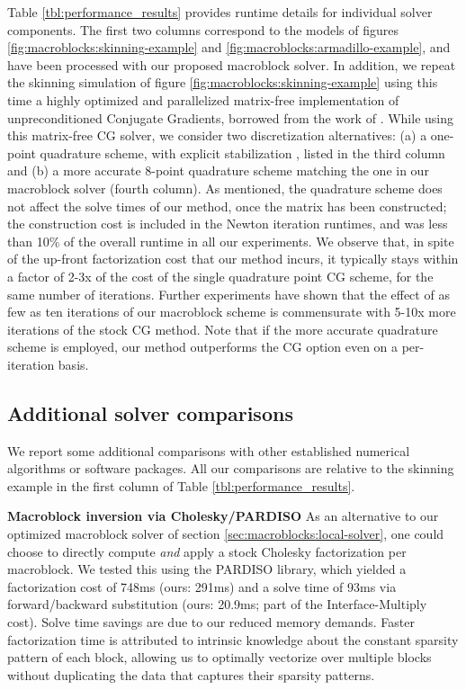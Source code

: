 Table \ref{tbl:performance_results} provides runtime details for
individual solver components. The first two columns correspond to the
models of figures \ref{fig:macroblocks:skinning-example} and
\ref{fig:macroblocks:armadillo-example}, and have been processed with our proposed
macroblock solver. In addition, we repeat the skinning simulation of
figure \ref{fig:macroblocks:skinning-example} using this time a highly optimized
and parallelized matrix-free implementation of unpreconditioned
Conjugate Gradients, borrowed from the work of \citet{MitchCS:2015}. While using this matrix-free CG solver, we
consider two discretization alternatives: (a) a one-point quadrature
scheme, with explicit stabilization
\citep{McAdaZSETTS:2011,PatteMS:2012}, listed in the third column and
(b) a more accurate 8-point quadrature scheme matching the one in our
macroblock solver (fourth column). As mentioned, the quadrature scheme
does not affect the solve times of our method, once the matrix has
been constructed; the construction cost is included in the Newton
iteration runtimes, and was less than 10\% of the overall runtime in
all our experiments. We observe that, in spite of the up-front
factorization cost that our method incurs, it typically stays within a
factor of 2-3x of the cost of the single quadrature point CG scheme,
for the same number of iterations. Further experiments have shown that
the effect of as few as ten iterations of our macroblock scheme is
commensurate with 5-10x more iterations of the stock CG method. Note
that if the more accurate quadrature scheme is employed, our method
outperforms the CG option even on a per-iteration basis.

\subsection{Additional solver comparisons} 

We report some additional comparisons with other established numerical
algorithms or software packages. All our comparisons are relative to
the skinning example in the first column of Table
\ref{tbl:performance_results}.

\noindent\textbf{Macroblock inversion via Cholesky/PARDISO} As an
alternative to our optimized macroblock solver of section
\ref{sec:macroblocks:local-solver}, one could choose to directly compute
\emph{and} apply a stock Cholesky factorization per macroblock. We
tested this using the PARDISO library, which yielded a factorization
cost of 748ms (ours: 291ms) and a solve time of 93ms via
forward/backward substitution (ours: 20.9ms; part of the
\textsf{Interface-Multiply} cost). Solve time savings are due to our
reduced memory demands. Faster factorization time is attributed to
intrinsic knowledge about the constant sparsity pattern of each block,
allowing us to optimally vectorize over multiple blocks without
duplicating the data that captures their sparsity patterns.

